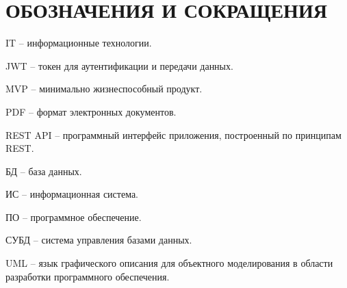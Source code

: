 \section*{ОБОЗНАЧЕНИЯ И СОКРАЩЕНИЯ}

IT -- информационные технологии.

JWT -- токен для аутентификации и передачи данных.

MVP -- минимально жизнеспособный продукт.

PDF -- формат электронных документов.

REST API -- программный интерфейс приложения, построенный по принципам REST.

БД -- база данных.

ИС -- информационная система.

ПО -- программное обеспечение.

СУБД -- система управления базами данных.

UML -- язык графического описания для объектного моделирования в области разработки программного обеспечения.
